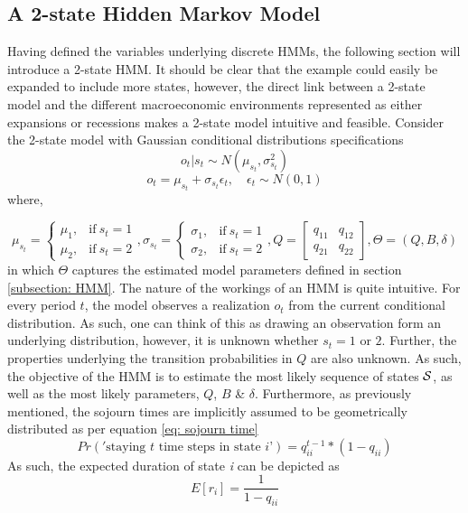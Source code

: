 \subsection{A 2-state Hidden Markov Model}
Having defined the variables underlying discrete HMMs, the following section will introduce a 2-state HMM. It should be clear that the example could easily be expanded to include more states, however, the direct link between a 2-state model and the different macroeconomic environments represented as either expansions or recessions makes a 2-state model intuitive and feasible. Consider the 2-state model with Gaussian conditional distributions specifications
\begin{equation}
     o_t|s_t \sim N(\mu_{s_t},\sigma^2_{s_t}) 
\end{equation}
\begin{equation}
   o_t = \mu_{s_t}  + \sigma_{s_t}\epsilon_{t}
   ,\quad \epsilon_{t} \sim N(0,1)   
\end{equation}
where,

$$
    \mu_{s_t}=
    \begin{cases}
        \mu_1, & \text{if}\ s_t = 1 \\
        \mu_2, & \text{if}\ s_t = 2
    \end{cases},
    \sigma_{s_t} =
    \begin{cases}
        \sigma_1, & \text{if}\ s_t = 1 \\
        \sigma_2, & \text{if}\ s_t = 2
    \end{cases},
    Q = 
    \begin{bmatrix}
    q_{11} & q_{12} \\
    q_{21} & q_{22}
    \end{bmatrix},
    \Theta = (Q, B, \delta)
$$
in which $\Theta$ captures the estimated model parameters defined in section \ref{subsection: HMM}. The nature of the workings of an HMM is quite intuitive. For every period $t$, the model observes a realization $o_t$ from the current conditional distribution. As such, one can think of this as drawing an observation form an underlying distribution, however, it is unknown whether $s_t = 1$ or $2$. Further, the properties underlying the transition probabilities in $Q$ are also unknown. As such, the objective of the HMM is to estimate the most likely sequence of states $\S$, as well as the most likely parameters, $Q$, $B$ \& $\delta$. Furthermore, as previously mentioned, the sojourn times are implicitly assumed to be geometrically distributed as per equation \ref{eq: sojourn time}
\begin{equation}
    Pr('\text{staying $t$ time steps in state $i$'}) = q^{t-1}_{ii} *(1-q_{ii})
    \label{eq: sojourn time}
\end{equation}
As such, the expected duration of state \textit{i} can be depicted as 
\begin{equation}
    E[r_i] = \frac{1}{1-q_{ii}}
    \label{eq: geometric distribution memory}
\end{equation}

